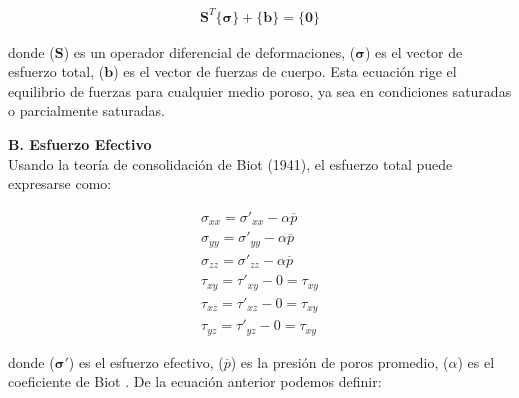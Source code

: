 \begin{ceqn} 
\begin{gather} \label{eq:equ33} 
\mathbf{S}^T\{\mathbf{\sigma}\} + \{\mathbf{b}\} = \{\mathbf{0}\}
\end{gather}  
\end{ceqn}
donde ($\mathbf{S}$) es un operador diferencial de deformaciones, ($\mathbf{\sigma}$) es el vector de esfuerzo total, ($\mathbf{b}$) es el vector de fuerzas de cuerpo. Esta ecuación rige el equilibrio de fuerzas para cualquier medio poroso, ya sea en condiciones saturadas o parcialmente saturadas.\bigskip


\textbf{B. Esfuerzo Efectivo}
\\
Usando la teoría de consolidación de Biot (1941)\cite{Biot1941GeneralConsolidation}, el esfuerzo total puede expresarse como:

\begin{ceqn} 
\begin{subequations} \label{eq:equ34} 
\begin{gather}
\sigma_{xx} = \sigma'_{xx} - \alpha \overline{p}  \label{eq:equ34a}   \\[3pt]
\sigma_{yy} = \sigma'_{yy} - \alpha \overline{p}  \label{eq:equ34b}   \\[3pt]
\sigma_{zz} = \sigma'_{zz} - \alpha \overline{p}  \label{eq:equ34c}   \\[3pt]
\tau_{xy}   = \tau'_{xy} - 0 = \tau_{xy} \label{eq:equ34d} \\[3pt]
\tau_{xz}   = \tau'_{xz} - 0 = \tau_{xy} \label{eq:equ34e} \\[3pt]
\tau_{yz}   = \tau'_{yz} - 0 = \tau_{xy} \label{eq:equ34f}
\end{gather}  
\end{subequations} 
\end{ceqn}
donde ($\mathbf{\sigma'}$) es el esfuerzo efectivo, ($\overline{p}$) es la presión de poros promedio, ($\alpha$) es el coeficiente de Biot \cite{Biot1941GeneralConsolidation}. De la ecuación anterior podemos definir:

